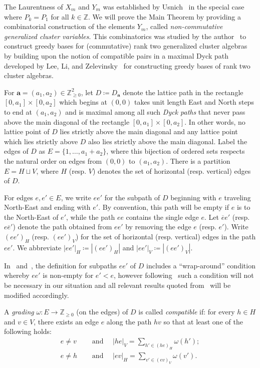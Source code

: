 \documentclass[ALCO,ThmDefs,Unicode,epreuves]{cedram}
\newcommand{\bfa}{\mathbf{a}}
\newcommand{\ZZ}{\mathbb{Z}}
\begin{document}
 The Laurentness of $X_m$ and $Y_m$ was established by Usnich~\cite{usnich2} in the special case where $P_k=P_1$ for all $k\in\ZZ$.
 We will prove the Main Theorem by providing a combinatorial construction of the elements $Y_m$, called \emph{non-commutative generalized cluster variables}. 
 This combinatorics was studied by the author~\cite{rupel2} to construct greedy bases for (commutative) rank two generalized cluster algebras by building upon the notion of compatible pairs in a maximal Dyck path developed by Lee, Li, and Zelevinsky~\cite{lee-li-zelevinsky} for constructing greedy bases of rank two cluster algebras.

 For $\bfa=(a_1,a_2)\in\ZZ_{\ge0}^2$, let $D\coloneqq D_\bfa$ denote the lattice path in the rectangle $[0,a_1]\times[0,a_2]$ which begins at $(0,0)$ takes unit length East and North steps to end at $(a_1,a_2)$ and is maximal among all such \emph{Dyck paths} that never pass above the main diagonal of the rectangle $[0,a_1]\times[0,a_2]$. 
 In other words, no lattice point of $D$ lies strictly above the main diagonal and any lattice point which lies strictly above $D$ also lies strictly above the main diagonal.
 Label the edges of $D$ as $E=\{1,\ldots,a_1+a_2\}$, where this bijection of ordered sets respects the natural order on edges from $(0,0)$ to $(a_1,a_2)$.
 There is a partition $E=H\sqcup V$, where $H$ (resp. $V$) denotes the set of horizontal (resp. vertical) edges of $D$. 

 For edges $e,e'\in E$, we write $ee'$ for the subpath of $D$ beginning with $e$ traveling North-East and ending with $e'$. 
 By convention, this path will be empty if $e$ is to the North-East of $e'$, while the path $ee$ contains the single edge $e$. 
 Let $\overline{e}e'$ (resp. $e\overline{e}'$) denote the path obtained from $ee'$ by removing the edge $e$ (resp. $e'$). 
 Write $(ee')_H$ (resp. $(ee')_V$) for the set of horizontal (resp. vertical) edges in the path $ee'$.
 We abbreviate $|ee'|_H\coloneqq |(ee')_H|$ and $|ee'|_V\coloneqq |(ee')_V|$. 
 
 \begin{remark}
 In~\cite{lee-li-zelevinsky} and~\cite{rupel2}, the definition for subpaths $ee'$ of $D$ includes a ``wrap-around'' condition whereby $ee'$ is non-empty for $e'<e$, however following~\cite[Remark~2.21]{rupel2} such a condition will not be necessary in our situation and all relevant results quoted from~\cite{rupel2} will be modified accordingly.
 \end{remark}

 \begin{definition}
 \label{def:compatibility}
 A \emph{grading} $\omega:E\to\ZZ_{\ge0}$ (on the edges) of $D$ is called \emph{compatible} if: for every $h\in H$ and $v\in V$, there exists an edge $e$ along the path $hv$ so that at least one of the following holds:
 \begin{align}
 \tag{HGC}\label{eq:hgc} e\ne v\quad&\text{ and }\quad |he|_V=\sum\limits_{h'\in(he)_H} \omega(h');\\
 \tag{VGC}\label{eq:vgc} e\ne h\quad&\text{ and }\quad |ev|_H=\sum\limits_{v'\in(ev)_V} \omega(v').
 \end{align}
 \end{definition}
\end{document}
